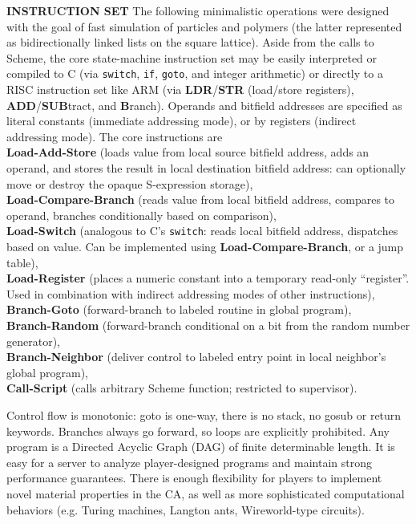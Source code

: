 \documentclass{acm_proc_article-sp}
\begin{document}
{\bf INSTRUCTION SET}
The following minimalistic operations were designed with the goal of fast simulation of particles and polymers
(the latter represented as bidirectionally linked lists on the square lattice).
Aside from the calls to Scheme, the core state-machine instruction set may be easily interpreted or compiled to C (via {\tt switch}, {\tt if}, {\tt goto}, and integer arithmetic)
or directly to a RISC instruction set like ARM\cite{seal00} (via {\bf LDR}/{\bf STR} (load/store registers), {\bf ADD}/{\bf SUB}tract, and {\bf B}ranch).
Operands and bitfield addresses are specified as literal constants (immediate addressing mode), or by registers (indirect addressing mode).
The core instructions are
\\
{\bf Load-Add-Store} (loads value from local source bitfield address, adds an operand, and stores the result in local destination bitfield address: can optionally move or destroy the opaque S-expression storage),
\\
{\bf Load-Compare-Branch} (reads value from local bitfield address, compares to operand, branches conditionally based on comparison),
\\
{\bf Load-Switch} (analogous to C's {\tt switch}: reads local bitfield address, dispatches based on value. Can be implemented using {\bf Load-Compare-Branch}, or a jump table),
\\
{\bf Load-Register} (places a numeric constant into a temporary read-only ``register''. Used in combination with indirect addressing modes of other instructions),
\\
{\bf Branch-Goto} (forward-branch to labeled routine in global program),
\\
{\bf Branch-Random} (forward-branch conditional on a bit from the random number generator),
\\
{\bf Branch-Neighbor} (deliver control to labeled entry point in local neighbor's global program),
\\
{\bf Call-Script} (calls arbitrary Scheme function; restricted to supervisor).

Control flow is monotonic: goto is one-way, there is no stack, no gosub or return keywords.
Branches always go forward, so loops are explicitly prohibited.
Any program is a Directed Acyclic Graph (DAG) of finite determinable length.
It is easy for a server to analyze player-designed programs and maintain strong performance guarantees.
There is enough flexibility for players to implement novel material properties in the CA,
as well as more sophisticated computational behaviors (e.g. Turing machines, Langton ants, Wireworld-type circuits).
\end{document}
